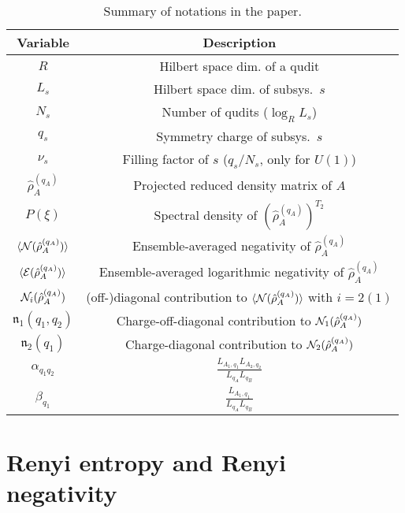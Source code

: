 \documentclass[aps,pra,reprint,superscriptaddress,twocolumn,notitlepage]{revtex4-1}
\numberwithin{equation}{section}
\begin{document}
\begin{table}[]
    \centering
{\footnotesize 
\renewcommand{\arraystretch}{1.2}
\begin{tabular}{cc}
    \hline
    Variable & Description \\
    \hline
    \hline
    $R$ &  Hilbert space dim. of a qudit
     \\
    $L_s$ & Hilbert space dim. of subsys.~$s$
     \\
    $N_s$ & Number of qudits ($\log_R L_s$)
     \\
    $q_s$ & Symmetry charge of subsys.~$s$
     \\
    $\nu_s$ & Filling factor of $s$ ($q_s/N_s$, only for $U(1)$)
     \\
    \hline
$\hat\rho_A^{(q_A)}$  & Projected reduced density matrix of $A$       \\
$P(\xi)$  & Spectral density of $(\hat\rho_A^{(q_A)})^{T_2}$       \\
$\braket{{\cal N}(\hat\rho_A^{(q_A)})}$  & Ensemble-averaged negativity of $\hat\rho_A^{(q_A)}$       \\
$\braket{{\cal E}(\hat\rho_A^{(q_A)})}$  & Ensemble-averaged logarithmic negativity of $\hat\rho_A^{(q_A)}$       \\
${\cal N}_i(\hat\rho_A^{(q_A)})$ & (off-)diagonal contribution to $\braket{{\cal N}(\hat\rho_A^{(q_A)})}$ with $i=2(1)$ \\
$\mathfrak{n}_1(q_1,q_2)$ &  Charge-off-diagonal contribution to ${\cal N}_1(\hat\rho_A^{(q_A)})$  \\
$\mathfrak{n}_2(q_1)$ &  Charge-diagonal contribution to ${\cal N}_2(\hat\rho_A^{(q_A)})$ \\
    \hline
$\alpha_{q_1q_2}$ & $\frac{L_{A_1,q_1} L_{A_2,q_2}}{L_{q_A} L_{q_B}}$
\\
$\beta_{q_1}$  & $\frac{ L_{A_1,q_1} }{ L_{q_A} L_{q_B} }$      \\
     \hline
\end{tabular}
}
\renewcommand{\arraystretch}{1}
    \caption{Summary of notations in the paper.}
    \label{tab:notation}
\end{table}


\section{Renyi entropy and Renyi negativity}
\label{sec:moments}
\end{document}
